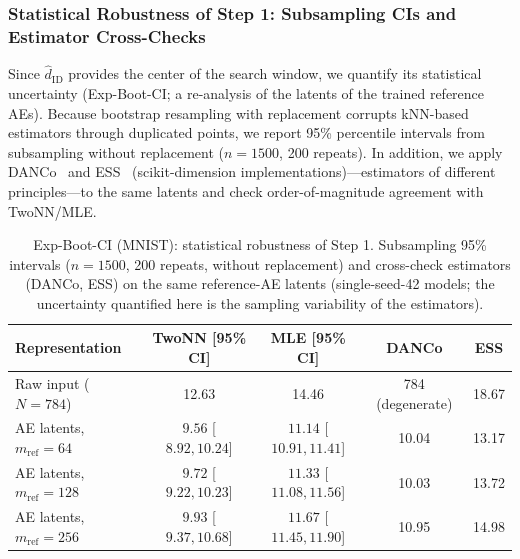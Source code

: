 \documentclass[make,article,submit,pdftex,moreauthors]{Definitions/mdpi}
\newcommand{\hatdID}{\hat{d}_{\mathrm{ID}}}
\begin{document}
\subsubsection{Statistical Robustness of Step 1: Subsampling CIs and Estimator Cross-Checks}
\label{sec:exp_mnist_ci}

Since $\hatdID$ provides the center of the search window, we quantify its
statistical uncertainty (Exp-Boot-CI; a re-analysis of the latents of the
trained reference AEs).
Because bootstrap resampling with replacement corrupts kNN-based estimators
through duplicated points, we report 95\% percentile intervals from
subsampling without replacement ($n = 1500$, 200 repeats).
In addition, we apply DANCo~\cite{ceruti2014danco} and
ESS~\cite{johnsson2015ess} (scikit-dimension implementations)---estimators
of different principles---to the same latents and check order-of-magnitude
agreement with TwoNN/MLE.

\begin{table}[H]
\caption{Exp-Boot-CI (MNIST): statistical robustness of Step 1.
Subsampling 95\% intervals ($n = 1500$, 200 repeats, without replacement)
and cross-check estimators (DANCo, ESS) on the same reference-AE latents
(single-seed-42 models; the uncertainty quantified here is the sampling
variability of the estimators).}
\label{tab:boot_ci}
\small
\begin{tabular}{lcccc}
\toprule
\textbf{Representation} & \textbf{TwoNN [95\% CI]} & \textbf{MLE [95\% CI]} & \textbf{DANCo} & \textbf{ESS} \\
\midrule
Raw input ($N = 784$) & 12.63 & 14.46 & 784 (degenerate) & 18.67 \\
\midrule
AE latents, $m_{\mathrm{ref}} = 64$  & $9.56$ [$8.92, 10.24$] & $11.14$ [$10.91, 11.41$] & 10.04 & 13.17 \\
AE latents, $m_{\mathrm{ref}} = 128$ & $9.72$ [$9.22, 10.23$] & $11.33$ [$11.08, 11.56$] & 10.03 & 13.72 \\
AE latents, $m_{\mathrm{ref}} = 256$ & $9.93$ [$9.37, 10.68$] & $11.67$ [$11.45, 11.90$] & 10.95 & 14.98 \\
\bottomrule
\end{tabular}
\end{table}
\end{document}
